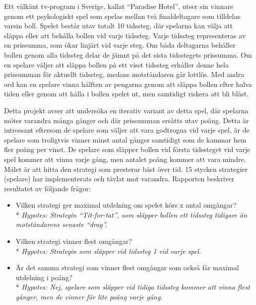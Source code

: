 Ett välkänt tv-program i Sverige, kallat “Paradise Hotel”, utser sin vinnare genom ett psykologiskt spel som spelas mellan två finaldeltagare som tilldelas varsin boll. Spelet består utav totalt 10 tidssteg, där spelarna kan välja att släppa eller att behålla bollen vid varje tidssteg. Varje tidssteg representeras av en prissumma, som ökar linjärt vid varje steg. Om båda deltagarna behåller bollen genom alla tidssteg delar de jämnt på det sista tidsstegets prissumma. Om en spelare väljer att släppa bollen på ett visst tidssteg erhåller denne hela prissumman för aktuellt tidssteg, medans motståndaren går lottlös. Med andra ord kan en spelare vinna hälften av pengarna genom att släppa bollen efter halva tiden eller genom att hålla i bollen spelet ut, men samtidigt riskera att bli blåst.

Detta projekt avser att undersöka en iterativ variant av detta spel, där spelarna möter varandra många gånger och där prissumman ersätts utav poäng. Detta är intressant eftersom de spelare som väljer att vara godtrogna vid varje spel, är de spelare som troligtvis vinner minst antal gånger samtidigt som de kammar hem fler poäng per vinst. De spelare som släpper bollen vid första tidssteget vid varje spel kommer att vinna varje gång, men antalet poäng kommer att vara mindre. Målet är att hitta den strategi som presterar bäst över tid. 15 stycken strategier (spelare) har implementerats och tävlat mot varandra. Rapporten beskriver resultatet av följande frågor:

\begin{itemize}
\item \nohyphens{Vilken strategi ger maximal utdelning om spelet körs x antal omgångar?}\\*
	\emph{Hypotes: Strategin “Tit-for-tat”, som släpper bollen ett tidssteg tidigare än motståndarens senaste “drag”.}
\item Vilken strategi vinner flest omgångar?\\*
	\emph{Hypotes: Strategin som släpper vid tidssteg 1 vid varje spel.}
\item \nohyphens{Är det samma strategi som vinner flest omgångar som också får maximal utdelning i poäng?}\\*
	\emph{Hypotes: Nej, spelare som släpper vid tidiga tidssteg kommer att vinna flest gånger, men de vinner för lite poäng varje gång.}
\end{itemize}